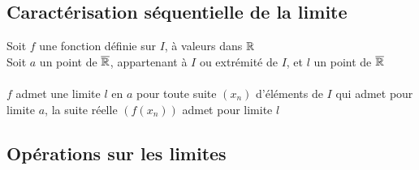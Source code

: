 \subsection{Caractérisation séquentielle de la limite}
\begin{theo}
    Soit \(f\) une fonction définie sur \(I\), à valeurs dans \(\mathbb{R}\)\\
    Soit \(a\) un point de \(\overline{\mathbb{R}}\), appartenant à \(I\) ou extrémité de \(I\), et \(l\) un point de \(\overline{\mathbb{R}}\)\\~\\
    \(f\) admet une limite \(l\) en \(a\) \ssi pour toute suite \((x_n)\) d'éléments de \(I\) qui admet pour limite \(a\), la suite réelle \((f(x_n))\) admet pour limite \(l\)
\end{theo}

\subsection{Opérations sur les limites}
